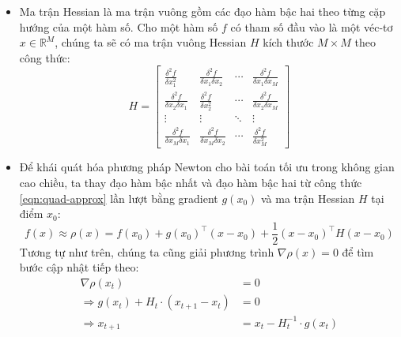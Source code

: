 \begin{itemize}
	\item Ma trận Hessian là ma trận vuông gồm các đạo hàm bậc hai theo từng cặp hướng của một hàm số. Cho một hàm số $f$ có tham số đầu vào là một véc-tơ $x \in \mathbb{R}^M$, chúng ta sẽ có ma trận vuông Hessian $H$ kích thước $M\times M$ theo công thức:
	\begin{equation}
		H = \begin{bmatrix}
			\frac{\delta^2 f}{\delta x^{2}_1} & \frac{\delta^2 f}{\delta x_1 \delta x_2} & \dotsb & \frac{\delta^2 f}{\delta x_1 \delta x_M} \\
			\frac{\delta^2 f}{\delta x_2 \delta x_1} & \frac{\delta^2 f}{\delta x^{2}_2} & \dotsb & \frac{\delta^2 f}{\delta x_2 \delta x_M} \\
			\vdots & \vdots & \ddots & \vdots \\
			\frac{\delta^2 f}{\delta x_M \delta x_1} & \frac{\delta^2 f}{\delta x_M \delta x_2} & \dotsb & \frac{\delta^2 f}{\delta x^{2}_M}
		\end{bmatrix}
	\end{equation}

	\item Để khái quát hóa phương pháp Newton cho bài toán tối ưu trong không gian cao chiều, ta thay đạo hàm bậc nhất và đạo hàm bậc hai từ công thức \ref{eqn:quad-approx} lần lượt bằng gradient $g(x_0)$ và ma trận Hessian $H$ tại điểm $x_0$:
	\begin{equation} \label{eqn:hessian-approx}
		f(x) \approx \rho(x) = f(x_0) + g(x_0)^\top (x - x_0) + \frac{1}{2}(x - x_0)^\top H(x - x_0)
	\end{equation}
	Tương tự như trên, chúng ta cũng giải phương trình $\nabla\rho(x)=0$ để tìm bước cập nhật tiếp theo:
	\begin{equation} \label{eqn:hessian-update}
		\begin{aligned}
			\nabla \rho(x_t) &= 0 \\
			\Rightarrow g(x_t) + H_t \cdot (x_{t+1} - x_t) &= 0 \\
			\Rightarrow x_{t+1} &= x_t - H^{-1}_t \cdot g(x_t)
		\end{aligned}
	\end{equation}
\end{itemize}

